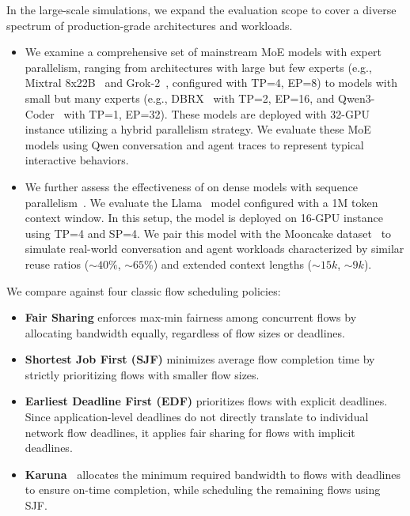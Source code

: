 In the large-scale simulations, we expand the evaluation scope to cover a diverse spectrum of production-grade architectures and workloads.
\begin{itemize}[leftmargin=*]
    \item We examine a comprehensive set of mainstream MoE models with expert parallelism, ranging from architectures with large but few experts (e.g., Mixtral 8x22B~\cite{mixtral22b} and Grok-2~\cite{grok}, configured with TP=4, EP=8) to models with small but many experts (e.g., DBRX~\cite{dbrx} with TP=2, EP=16, and Qwen3-Coder~\cite{qwen-coder} with TP=1, EP=32). These models are deployed with 32-GPU instance utilizing a hybrid parallelism strategy. We evaluate these MoE models using Qwen conversation and agent traces to represent typical interactive behaviors.
    \item We further assess the effectiveness of \sys{} on dense models with sequence parallelism~\cite{ringattention}. We evaluate the Llama~\cite{llama} model configured with a 1M token context window. In this setup, the model is deployed on 16-GPU instance using TP=4 and SP=4. We pair this model with the Mooncake dataset~\cite{mooncake} to simulate real-world conversation and agent workloads characterized by similar reuse ratios ($\sim40\%$, $\sim65\%$) and extended context lengths ($\sim15k$, $\sim9k$).
\end{itemize}

 We compare \sys{} against four classic flow scheduling policies:
\begin{itemize}[leftmargin=*]
    \item \textbf{Fair Sharing} enforces max-min fairness among concurrent flows by allocating bandwidth equally, regardless of flow sizes or deadlines.
    \item \textbf{Shortest Job First (SJF)} minimizes average flow completion time by strictly prioritizing flows with smaller flow sizes.
    \item \textbf{Earliest Deadline First (EDF)} prioritizes flows with explicit deadlines. Since application-level deadlines do not directly translate to individual network flow deadlines, it applies fair sharing for flows with implicit deadlines.
    \item \textbf{Karuna~\cite{karuna}} allocates the minimum required bandwidth to flows with deadlines to ensure on-time completion, while scheduling the remaining flows using SJF.
\end{itemize}

